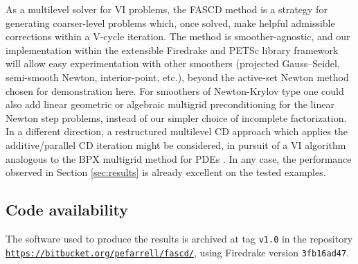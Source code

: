 \documentclass[review,hidelinks,onefignum,onetabnum,final]{siamart220329}  %
\begin{document}
As a multilevel solver for VI problems, the FASCD method is a strategy for generating coarser-level problems which, once solved, make helpful admissible corrections within a V-cycle iteration.  The method is smoother-agnostic, and our implementation within the extensible Firedrake \cite{Rathgeberetal2016} and PETSc \cite{Balayetal2023} library framework will allow easy experimentation with other smoothers (projected Gauss--Seidel, semi-smooth Newton, interior-point, etc.), beyond the active-set Newton method chosen for demonstration here.  For smoothers of Newton-Krylov type one could also add linear geometric or algebraic multigrid preconditioning \cite{Trottenbergetal2001} for the linear Newton step problems, instead of our simpler choice of incomplete factorization.  In a different direction, a restructured multilevel CD approach which applies the additive/parallel CD iteration \cite{Tai2003} might be considered, in pursuit of a VI algorithm analogous to the BPX multigrid method for PDEs \cite{BramblePasciakXu1990}.  In any case, the performance observed in Section \ref{sec:results} is already excellent on the tested examples.


\subsection*{Code availability} \label{sec:code}  The software used to produce the results is archived at tag \texttt{v1.0} in the repository \texttt{\url{https://bitbucket.org/pefarrell/fascd/}}, using Firedrake version \texttt{3fb16ad47}.




\end{document}
